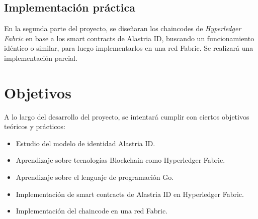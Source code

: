 \subsection{Implementación práctica}
En la segunda parte del proyecto, se diseñaran los chaincodes de \textit{Hyperledger Fabric} \cite{fabric} en base a los smart contracts de Alastria ID, buscando un funcionamiento idéntico o similar, para luego implementarlos en una red Fabric. Se realizará una implementación parcial.

\section{Objetivos}
A lo largo del desarrollo del proyecto, se intentará cumplir con ciertos objetivos teóricos y prácticos:

\begin{itemize}
  \item Estudio del modelo de identidad Alastria ID.
  \item Aprendizaje sobre tecnologías Blockchain como Hyperledger Fabric.
  \item Aprendizaje sobre el lenguaje de programación Go.
  \item Implementación de smart contracts de Alastria ID en Hyperledger Fabric.
  \item Implementación del chaincode en una red Fabric.
\end{itemize}